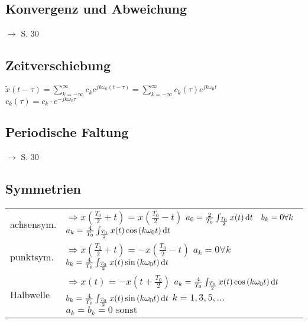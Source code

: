 \documentclass[german]{latex4ei/latex4ei_sheet}
\renewcommand{\diff}{\mathop{}\!\mathrm{\vphantom( d}}
\begin{document}
\begin{sectionbox}
		\subsection*{Konvergenz und Abweichung}
		$\rightarrow$ S. 30
		
		\subsection*{Zeitverschiebung}
		$\tilde{x}(t - \tau) = \sum\limits_{k = -\infty}^{\infty}{c_k e^{j k \omega_0 (t - \tau)}} = \sum\limits_{k = -\infty}^{\infty}{c_k(\tau) e^{j k \omega_0 t}}$\\
		$c_k(\tau) = c_k \cdot e^{-j k \omega_0 \tau}$
		
		\subsection*{Periodische Faltung}
		$\rightarrow$ S. 30
		
		\subsection*{Symmetrien}
		\begin{tabularx}{\linewidth}{p{1.5cm}X}
			achsensym. & $\Rightarrow x\left(\frac{T_0}{2} + t\right) = x\left(\frac{T_0}{2} - t\right)$ \newline $a_0 = \frac{2}{T_0} \int_{\frac{T_0}{2}}{x(t) \diff t} \quad b_k = 0 \forall k$ \newline $a_k = \frac{4}{T_0} \int_{\frac{T_0}{2}}{x(t) \cos{(k \omega_0 t)} \diff t}$ \\
			punktsym. & $\Rightarrow x\left(\frac{T_0}{2} + t\right) = -x\left(\frac{T_0}{2} - t\right)$ \newline $a_k = 0 \forall k$ \newline $b_k = \frac{4}{T_0} \int_{\frac{T_0}{2}}{x(t) \sin{(k \omega_0 t)} \diff t}$ \\
			Halbwelle & $\Rightarrow x(t) = -x\left(t + \frac{T_0}{2}\right)$ \newline $a_k = \frac{4}{T_0} \int_{\frac{T_0}{2}}{x(t) \cos{(k \omega_0 t)} \diff t}$ \newline $b_k = \frac{4}{T_0} \int_{\frac{T_0}{2}}{x(t) \sin{(k \omega_0 t)} \diff t}$ \newline $k = 1,3,5,\dots$ \newline $a_k = b_k = 0 \text{ sonst}$ \\
		\end{tabularx}
	\end{sectionbox}
\end{document}
